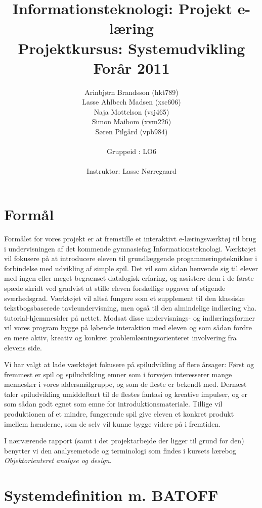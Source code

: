 \documentclass[10pt,a4paper,danish]{article}
\title{Informationsteknologi: Projekt e-læring \\ Projektkursus: Systemudvikling \\Forår 2011}
\author{Arinbjørn Brandsson (hkt789)\\Lasse Ahlbech Madsen (xsc606)\\Naja Mottelson (vsj465)\\Simon Maibom (xvm226) \\Søren Pilgård (vpb984)\\
\\
Gruppeid : LO6\\
\\Instruktor: Lasse Nørregaard}
\begin{document}
\maketitle
\newpage

\tableofcontents
\newpage


\section{Formål}
Formålet for vores projekt er at fremstille et interaktivt e-læringsværktøj til brug i undervisningen af det kommende gymnasiefag Informationsteknologi. Værktøjet vil fokusere på at introducere eleven til grundlæggende progammeringsteknikker i forbindelse med udvikling af simple spil. Det vil som sådan henvende sig til elever med ingen eller meget begrænset datalogisk erfaring, og assistere dem i de første spæde skridt ved gradvist at stille eleven forskellige opgaver af stigende sværhedsgrad. Værktøjet vil altså fungere som et supplement til den klassiske tekstbogsbaserede tavleundervisning, men også til den almindelige indlæring vha. tutorial-hjemmesider på nettet. Modsat disse undervisnings- og indlæringsformer vil vores program bygge på løbende interaktion med eleven og som sådan fordre en mere aktiv, kreativ og konkret problemløsningsorienteret involvering fra elevens side. 

Vi har valgt at lade værktøjet fokusere på spiludvikling af flere årsager: Først og fremmest er spil og spiludvikling emner som i forvejen interesserer mange mennesker i vores aldersmålgruppe, og som de fleste er bekendt med. Dernæst taler spiludvikling umiddelbart til de flestes fantasi og kreative impulser, og er som sådan godt egnet som emne for introduktionsmateriale. Tillige vil produktionen af et mindre, fungerende spil give eleven et konkret produkt imellem hænderne, som de selv vil kunne bygge videre på i fremtiden.

I nærværende rapport (samt i det projektarbejde der ligger til grund for den) benytter vi den analysemetode og terminologi som findes i kursets lærebog \emph{Objektorienteret analyse og design}. 

\section{Systemdefinition m. BATOFF}
\end{document}
